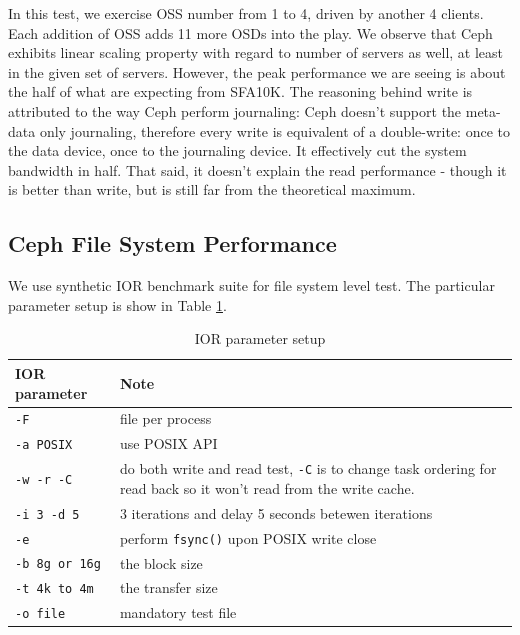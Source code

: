 \documentclass{article}
\begin{document}
In this test, we exercise OSS number from 1 to 4, driven by another 4 clients.
Each addition of OSS adds 11 more OSDs into the play. We observe that Ceph
exhibits linear scaling property with regard to number of servers as well, at
least in the given set of servers. However, the peak performance we are seeing
is about the half of what are expecting from SFA10K. The reasoning behind write
is attributed to the way Ceph perform journaling: Ceph doesn't support the
meta-data only journaling, therefore every write is equivalent of a
double-write: once to the data device, once to the journaling device. It
effectively cut the system bandwidth in half. That said, it doesn't explain the
read performance - though it is better than write, but is still far from the
theoretical maximum.


\subsection{Ceph File System Performance}

We use synthetic IOR benchmark suite for file system level test. The particular
parameter setup is show in Table \ref{tbl:ior}.


\begin{table}[tb]
\centering
\begin{tabular}{p{1.5in} | p{3in}}
    \toprule
    IOR parameter & Note \\ \midrule
    \verb!-F! & file per process \\ \midrule
    \verb!-a POSIX! & use POSIX API \\ \midrule
    \verb!-w -r -C! & do both write and read test, \verb!-C! is to change task
    	ordering for read back so it won't read from the write cache. \\ \midrule
    \verb!-i 3 -d 5! & 3 iterations and delay 5 seconds betewen iterations \\
    \midrule  
    \verb!-e! & perform \verb!fsync()! upon POSIX write close \\ \midrule
    \verb!-b 8g or 16g! & the block size \\ \midrule
    \verb!-t 4k to 4m! & the transfer size \\ \midrule
    \verb!-o file! & mandatory test file  \\   	
    \bottomrule
\end{tabular}
\caption{IOR parameter setup}
\label{tbl:ior}
\end{table}
\end{document}
